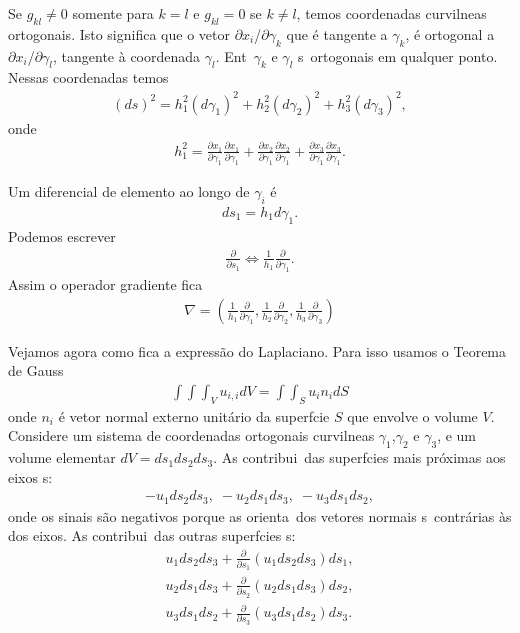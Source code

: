 Se $g_{kl} \neq 0$ somente para $k = l$ e $g_{kl} = 0$ se $k \neq
l$, temos coordenadas curvil\ih neas ortogonais. Isto significa que
o vetor $\partial x_{i}$/$ \partial \gamma_{k}$ que \'e tangente a
$\gamma_{k}$, \'e ortogonal a $\partial x_{i}$/$\partial
\gamma_{l}$, tangente \`a coordenada $\gamma_{l}$. Ent\ao\
$\gamma_{k}$ e $\gamma_{l}$ s\ao\ ortogonais em qualquer ponto.
Nessas coordenadas temos
\begin{eqnarray}
(ds)^{2} = h_{1}^{2}(d\gamma_{1})^{2} + h_{2}^{2}(d\gamma_{2})^{2}
+ h_{3}^{2}(d\gamma_{3})^{2},
\end{eqnarray}
onde
\begin{eqnarray}
h_{1}^{2} = \frac{\partial x_{1}}{\partial
\gamma_{1}}\frac{\partial x_{1}}{\partial \gamma_{1}} +
\frac{\partial x_{2}}{\partial \gamma_{1}}\frac{\partial
x_{2}}{\partial \gamma_{1}} + \frac{\partial x_{3}}{\partial
\gamma_{1}}\frac{\partial x_{3}}{\partial \gamma_{1}}.
\end{eqnarray}

Um diferencial de elemento ao longo de $\gamma_{i}$ \'e
\begin{eqnarray}
ds_{1} = h_{1}d\gamma_{1}.
\end{eqnarray}
Podemos escrever
\begin{eqnarray}
\frac{\partial}{\partial s_{1}} \Leftrightarrow
\frac{1}{h_{1}}\frac{\partial}{\partial\gamma_{1}}.
\end{eqnarray}
Assim o operador gradiente fica
\begin{eqnarray}
\nabla = \left(
\frac{1}{h_{1}}\frac{\partial}{\partial\gamma_{1}},
\frac{1}{h_{2}}\frac{\partial}{\partial\gamma_{2}},
\frac{1}{h_{3}}\frac{\partial}{\partial\gamma_{3}}\right)
\end{eqnarray}

Vejamos agora como fica a express\~ao do Laplaciano. Para isso usamos o Teorema de Gauss
\begin{eqnarray*}
\int\!\!\!\int\!\!\!\int_{V} u_{i,i}dV = \int\!\!\!\int_{S} u_{i}n_{i}dS
\end{eqnarray*}
onde $n_{i}$ \'e vetor normal externo unit\'ario da superf\ih cie $S$ que envolve o volume $V$. 
Considere um sistema de coordenadas ortogonais curvil\ih neas $\gamma_{1}$,$\gamma_{2}$ e $\gamma_{3}$, 
e um volume elementar $dV = ds_{1}ds_{2}ds_{3}$. As contribui\coes\ das superf\ih cies mais pr\'oximas aos eixos s\ao:
\begin{eqnarray*}
-u_{1}ds_{2}ds_{3}, \; -u_{2}ds_{1}ds_{3}, \; -u_{3}ds_{1}ds_{2},
\end{eqnarray*}
onde os sinais s\~ao negativos porque as orienta\coes\ dos vetores normais s\ao\ contr\'arias \`as dos eixos.
As contribui\coes\ das outras superf\ih cies s\ao:
\begin{eqnarray*}
u_{1}ds_{2}ds_{3}+\frac{\partial}{\partial s_{1}}(u_{1}ds_{2}ds_{3})ds_{1},\\
u_{2}ds_{1}ds_{3}+\frac{\partial}{\partial s_{2}}(u_{2}ds_{1}ds_{3})ds_{2},\\
u_{3}ds_{1}ds_{2}+\frac{\partial}{\partial s_{3}}(u_{3}ds_{1}ds_{2})ds_{3}.
\end{eqnarray*}

